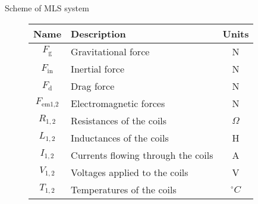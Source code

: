 \begin{frame}{Scheme of MLS system}
\begin{figure}[H]
\begin{minipage}{0.40\textwidth}
        \end{minipage}
        \hfill
        \begin{minipage}{0.55\textwidth}

            \centering

            \begin{tabular}{|c|l|c|}
                \hline
                \textbf{Name}      & \textbf{Description}               & \textbf{Units} \\
                \hline
                $F_{\text{g}}$     & Gravitational force                & N              \\
                $F_{\text{in}}$    & Inertial force                     & N              \\
                $F_{\text{d}}$     & Drag force                         & N              \\
                $F_{\text{em1,2}}$ & Electromagnetic forces             & N              \\
                \hline
                $R_{1,2}$          & Resistances of the coils           & $\Omega$       \\
                $L_{1,2}$          & Inductances of the coils           & H              \\
                $I_{1,2}$          & Currents flowing through the coils & A              \\
                $V_{1,2}$          & Voltages applied to the coils      & V              \\
                $T_{1,2}$          & Temperatures of the coils          & $^\circ C$     \\
                \hline
            \end{tabular}

        \end{minipage}

        \label{fig:MLS_scheme}

    \end{figure}

\end{frame}




